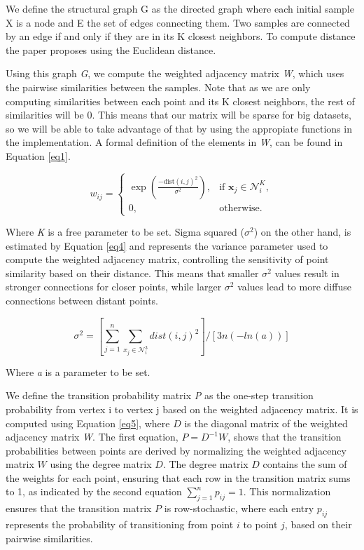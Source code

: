 \documentclass[
	10pt,
	parskip=half-,	
	paper=a4,
	english
	]{scrartcl}
\begin{document}
We define the structural graph G as the directed graph where each initial sample X is a node and E the set of edges connecting them. Two samples are connected by an edge if and only if they are in its K closest neighbors. To compute distance the paper proposes using the Euclidean distance.

Using this graph \textit{G}, we compute the weighted adjacency matrix \textit{W}, which uses the pairwise similarities between the samples. Note that as we are only computing similarities between each point and its K closest neighbors, the rest of similarities will be 0. This means that our matrix will be sparse for big datasets, so we will be able to take advantage of that by using the appropiate functions in the implementation. A formal definition of the elements in \textit{W}, can be found in Equation \ref{eq1}.

\begin{equation}
    w_{ij} =
    \begin{cases} 
    \exp \left( \frac{-\text{dist}(i,j)^2}{\sigma^2} \right), & \text{if } \mathbf{x}_j \in \mathcal{N}_i^K, \\
    0, & \text{otherwise}.
    \end{cases}
    \label{eq1}
\end{equation}

Where \textit{K} is a free parameter to be set. Sigma squared (\(\sigma^2\)) on the other hand, is estimated by Equation \ref{eq4} and represents the variance parameter used to compute the weighted adjacency matrix, controlling the sensitivity of point similarity based on their distance. This means that smaller \(\sigma^2\) values result in stronger connections for closer points, while larger \(\sigma^2\) values lead to more diffuse connections between distant points.

\begin{equation}
    \sigma^2 = [\sum_{j=1}^{n}\sum_{x_j\in \mathcal{N}_i^3}dist(i,j)^2] / [3n(-ln(a))]
    \label{eq4}    
\end{equation}

Where \textit{a} is a parameter to be set.

We define the transition probability matrix \textit{P} as the one-step transition probability from vertex i to vertex j based on the weighted adjacency matrix. It is computed using Equation \ref{eq5}, where \(D\) is the diagonal matrix of the weighted adjacency matrix \textit{W}. The first equation, \( P = D^{-1} W \), shows that the transition probabilities between points are derived by normalizing the weighted adjacency matrix \( W \) using the degree matrix \( D \). The degree matrix \( D \) contains the sum of the weights for each point, ensuring that each row in the transition matrix sums to 1, as indicated by the second equation \( \sum_{j=1}^n p_{ij} = 1 \). This normalization ensures that the transition matrix \( P \) is row-stochastic, where each entry \( p_{ij} \) represents the probability of transitioning from point \( i \) to point \( j \), based on their pairwise similarities.
\end{document}
